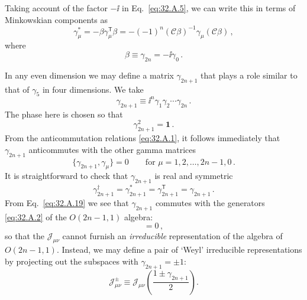Taking account of the factor \(-\ii\) in Eq.~\eqref{eq:32.A.5}, we can write
this in terms of Minkow\-skian components as
\begin{equation}
  \gamma_\mu^*
  =-\beta\gamma_\mu^{\mathsf T}\beta
  =-(-1)^n(\mathcal C\beta)^{-1}\gamma_\mu(\mathcal C\beta)\,,
  \tag{32.A.15}\label{eq:32.A.15}
\end{equation}
where
\begin{equation}
  \beta\equiv\gamma_{2n}=-\ii\gamma_0\,.
  \tag{32.A.16}\label{eq:32.A.16}
\end{equation}

In any even dimension we may define a matrix \(\gamma_{2n+1}\) that plays
a role similar to that of \(\gamma_5\) in four dimensions. We take
\begin{equation}
  \gamma_{2n+1}\equiv \ii^n\gamma_1\gamma_2\cdots\gamma_{2n}\,.
  \tag{32.A.17}\label{eq:32.A.17}
\end{equation}
The phase here is chosen so that
\begin{equation}
  \gamma_{2n+1}^2=\mathbf{1}\,.
  \tag{32.A.18}\label{eq:32.A.18}
\end{equation}
From the anticommutation relations \eqref{eq:32.A.1}, it follows immediately
that \(\gamma_{2n+1}\) anticommutes with the other gamma matrices
\begin{equation}
  \{\gamma_{2n+1},\gamma_\mu\}=0
  \qquad\text{for \(\mu=1,2,\ldots,2n-1,0\)}\,.
  \tag{32.A.19}\label{eq:32.A.19}
\end{equation}
It is straightforward to check that \(\gamma_{2n+1}\) is real and symmetric
\begin{equation}
  \gamma_{2n+1}^\dagger
  =\gamma_{2n+1}^*
  =\gamma_{2n+1}^{\mathsf T}
  =\gamma_{2n+1}\,.
  \tag{32.A.20}\label{eq:32.A.20}
\end{equation}
From Eq.~\eqref{eq:32.A.19} we see that \(\gamma_{2n+1}\) commutes with the
generators \eqref{eq:32.A.2} of the \(O(2n-1,1)\) algebra:
\begin{equation}
  [\gamma_{2n+1},\mathcal J_{\mu\nu}]=0\,,
  \tag{32.A.21}\label{eq:32.A.21}
\end{equation}
so that the \(\mathcal J_{\mu\nu}\) cannot furnish an \textit{irreducible}
representation of the algebra of \(O(2n-1,1)\). Instead, we may define a
pair of `Weyl' irreducible representations by projecting out the subspaces
with \(\gamma_{2n+1}=\pm1\):
\begin{equation}
  \mathcal J_{\mu\nu}^{\pm}
  \equiv\mathcal J_{\mu\nu}
  \left(\frac{1\pm\gamma_{2n+1}}{2}\right).
  \tag{32.A.22}\label{eq:32.A.22}
\end{equation}

